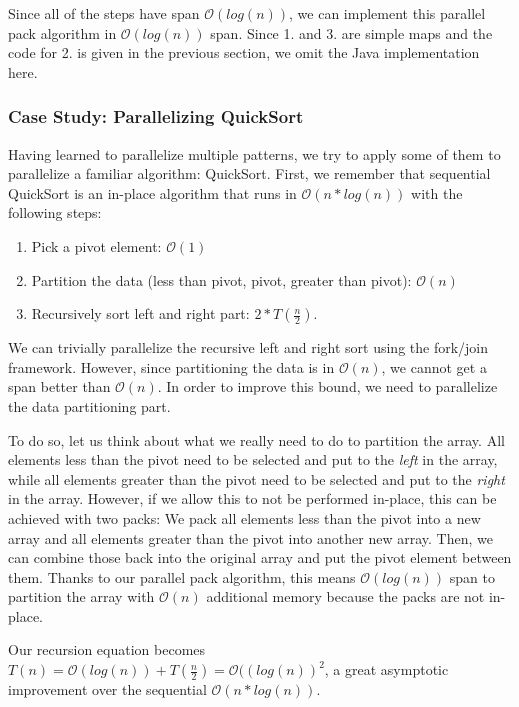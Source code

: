\documentclass[main.tex]{subfiles}
\begin{document}
\noindent Since all of the steps have span \(\mathcal{O}(log(n))\), we can implement this parallel pack algorithm in \(\mathcal{O}(log(n))\) span. Since 1. and 3. are simple maps and the code for 2. is given in the previous section, we omit the Java implementation here.

\subsubsection{Case Study: Parallelizing QuickSort}
Having learned to parallelize multiple patterns, we try to apply some of them to parallelize a familiar algorithm: QuickSort. First, we remember that sequential QuickSort is an in-place algorithm that runs in \(\mathcal{O}(n*log(n))\) with the following steps:

\begin{enumerate}
  \item Pick a pivot element: \(\mathcal{O}(1)\)
  \item Partition the data (less than pivot, pivot, greater than pivot): \(\mathcal{O}(n)\)
  \item Recursively sort left and right part: \(2*T\left(\frac{n}{2}\right)\).
\end{enumerate}

\noindent We can trivially parallelize the recursive left and right sort using the fork/join framework. However, since partitioning the data is in \(\mathcal{O}(n)\), we cannot get a span better than \(\mathcal{O}(n)\). In order to improve this bound, we need to parallelize the data partitioning part.

To do so, let us think about what we really need to do to partition the array. All elements less than the pivot need to be selected and put to the \textit{left} in the array, while all elements greater than the pivot need to be selected and put to the \textit{right} in the array. However, if we allow this to not be performed in-place, this can be achieved with two packs: We pack all elements less than the pivot into a new array and all elements greater than the pivot into another new array. Then, we can combine those back into the original array and put the pivot element between them. Thanks to our parallel pack algorithm, this means \(\mathcal{O}(log(n))\) span to partition the array with \(\mathcal{O}(n)\) additional memory because the packs are not in-place.

Our recursion equation becomes \(T(n)=\mathcal{O}(log(n))+T\left(\frac{n}{2}\right)=\mathcal{O}((log(n))^{2}\), a great asymptotic improvement over the sequential \(\mathcal{O}(n*log(n))\).
\end{document}

